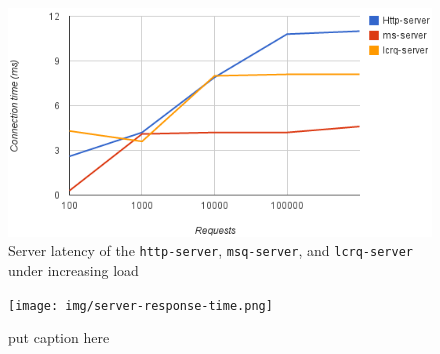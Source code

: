 \documentclass[twoside]{article}
\begin{document}
\begin{figure}[t]
\includegraphics[width=1\textwidth]{img/max-latency.png}
\caption{Server latency of the \texttt{http-server}, \texttt{msq-server},
  and \texttt{lcrq-server} under increasing load}
\end{figure}

\begin{figure}[t]
\texttt{[image: img/server-response-time.png]}
\caption{put caption here}
\end{figure}

{\small
  
  
}
\end{document}
